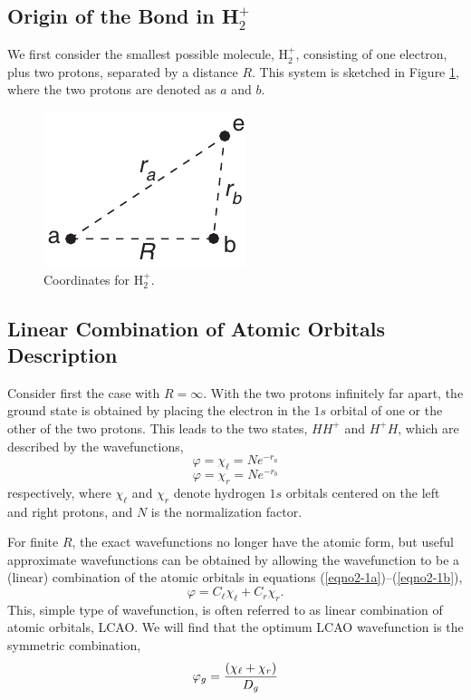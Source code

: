 \subsection{Origin of the Bond in H$^+_2$}

We first consider the smallest possible molecule, H$^+_2$, consisting
of one electron, plus two protons, separated by a distance $R$. This
system is sketched in Figure \ref{fig2-1}, where the two protons are
denoted as $a$ and $b$.

\begin{figure}
\begin{center}
\includegraphics[scale=0.75]{fig2-01}
\end{center}
\caption{Coordinates for H$_2^+$.}
\label{fig2-1}
\end{figure}


\subsection{Linear Combination of Atomic Orbitals Description}

Consider first the case with $R = \infty$. With the two protons infinitely 
far apart, the ground state is obtained by placing the electron in the 
$1s$ orbital of one or the other of the two protons. This leads to the two 
states, $HH^+$ and $H^+H$, which are described by the
wavefunctions,
\begin{equation}
\varphi = \chi_{\ell} = Ne^{-r_a}
\label{eqno2-1a}
\end{equation}
\begin{equation}
\varphi = \chi_r = Ne^{-r_b}
\label{eqno2-1b}
\end{equation}
respectively, where $\chi_\ell$ and $\chi_r$ denote hydrogen $1s$
orbitals centered on the left and right protons, and $N$ is the
normalization factor.

For finite $R$, the exact wavefunctions no longer have the atomic form, 
but useful approximate wavefunctions can be obtained by allowing the 
wavefunction to be a (linear) combination of the atomic orbitals in
equations (\ref{eqno2-1a})--(\ref{eqno2-1b}),
\begin{equation}
\varphi = C_{\ell} \chi_{\ell} + C_r \chi_r.
\end{equation}
This, simple type of wavefunction, is often referred to as linear
combination of atomic orbitals, LCAO. We will find that the optimum
LCAO wavefunction is the symmetric combination,
\begin{equation}
\varphi_g = {\left( \chi_{\ell} + \chi_r \right) \over D_g}
\label{eqno2-2}
\end{equation}

